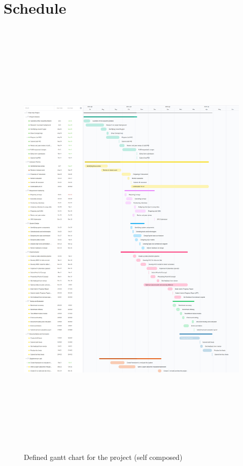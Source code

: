 \section{Schedule}
\begin{figure}[!ht]
    \includegraphics[height=22cm]{assets/gantt-chart.jpg}
    \caption{Defined gantt chart for the project (self composed)}
\end{figure}



